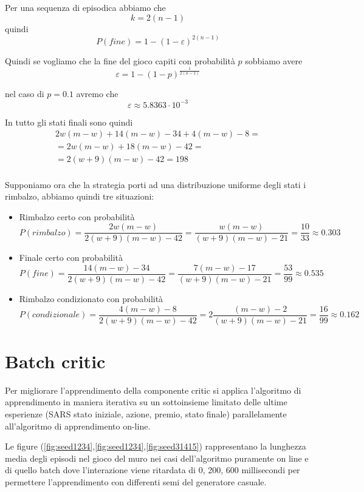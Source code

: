 \documentclass[a4paper,11pt]{article}
\begin{document}
Per una sequenza di episodica abbiamo che \[ k = 2(n-1) \] quindi
\[
P(fine) = 1 - (1 - \varepsilon) ^ {2(n-1)}
\]

Quindi se vogliamo che la fine del gioco capiti con probabilità $ p $ sobbiamo avere
\[
\varepsilon = 1- (1 - p) ^ \frac{1}{2(n-1)}
\]

nel caso di $ p = 0.1 $ avremo che 
\[
\varepsilon \approx 5.8363 \cdot 10^{-3}
\]

In tutto gli stati finali sono quindi 
\[
\begin{array}{r}
 2w(m-w)+14(m-w)-34+4(m-w)-8= \\
 =2w(m-w)+18(m-w)-42= \\
 =2(w+9)(m-w)-42= 198\\
\end{array}
\]

Supponiamo ora che la strategia porti ad una distribuzione uniforme degli stati i rimbalzo, abbiamo quindi tre situazioni:

\begin{itemize}
	\item 	
	Rimbalzo certo con probabilità
	 \[ P(rimbalzo)=\frac{2w(m-w)}{2(w+9)(m-w)-42}
	 =\frac{w(m-w)}{(w+9)(m-w)-21}
	 = \frac{10}{33}\approx0.303
	 \]

	\item 	
	Finale certo con probabilità 
	 \[ P(fine)=\frac{14(m-w)-34}{2(w+9)(m-w)-42}
	 =\frac{7(m-w)-17}{(w+9)(m-w)-21}
	 = \frac{53}{99}\approx0.535
	 \]
	 
	 \item 	
	 Rimbalzo condizionato con probabilità 
	 \[ P(condizionale)=\frac{4(m-w)-8}{2(w+9)(m-w)-42}
	 =2\frac{(m-w)-2}{(w+9)(m-w)-21}
	 = \frac{16}{99}\approx0.162
	 \]
\end{itemize}

\section{Batch critic}

Per migliorare l'apprendimento della componente critic si applica
l'algoritmo di apprendimento in maniera iterativa su un sottoinsieme limitato
delle ultime esperienze (SARS stato iniziale, azione, premio, stato finale)
parallelamente all'algoritmo di apprendimento on-line.


Le figure (\ref{fig:seed1234},\ref{fig:seed1234},\ref{fig:seed31415})  rappresentano la lunghezza media degli episodi nel
gioco del muro nei casi dell'algoritmo puramente on line e
di quello batch dove l'interazione viene ritardata di 0, 200, 600 millisecondi
per permettere l'apprendimento con differenti semi del generatore casuale.
\end{document}
